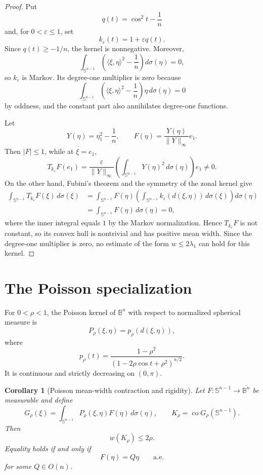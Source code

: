 \documentclass[11pt,reqno]{amsart}
\newtheorem{corollary}[theorem]{Corollary}
\theoremstyle{remark}
\begin{document}
\begin{proof}
Put
\[
 q(t)=\cos^2t-\frac1n
\]
and, for $0<\varepsilon\le1$, set
\[
 k_\varepsilon(t)=1+\varepsilon q(t).
\]
Since $q(t)\ge-1/n$, the kernel is nonnegative.  Moreover,
\[
 \int_{\mathbb S^{n-1}}
 \left(
 \langle\xi,\eta\rangle^2-\frac1n
 \right)d\sigma(\eta)=0,
\]
so $k_\varepsilon$ is Markov.  Its degree-one multiplier is zero because
\[
 \int_{\mathbb S^{n-1}}
 \left(
 \langle\xi,\eta\rangle^2-\frac1n
 \right)\eta\,d\sigma(\eta)=0
\]
by oddness, and the constant part also annihilates degree-one functions.

Let
\[
 Y(\eta)=\eta_1^2-\frac1n,
 \qquad
 F(\eta)=\frac{Y(\eta)}{\|Y\|_\infty}e_1.
\]
Then $|F|\le1$, while at $\xi=e_1$,
\[
 T_{k_\varepsilon}F(e_1)
 =
 \frac{\varepsilon}{\|Y\|_\infty}
 \left(
 \int_{\mathbb S^{n-1}}Y(\eta)^2\,d\sigma(\eta)
 \right)e_1
 \ne0.
\]
On the other hand, Fubini's theorem and the symmetry of the zonal kernel
give
\begin{align*}
 \int_{\mathbb S^{n-1}}T_{k_\varepsilon}F(\xi)\,d\sigma(\xi)
 &=
 \int_{\mathbb S^{n-1}}F(\eta)
 \left(
   \int_{\mathbb S^{n-1}}
   k_\varepsilon(d(\xi,\eta))\,d\sigma(\xi)
 \right)d\sigma(\eta)\\
 &=\int_{\mathbb S^{n-1}}F(\eta)\,d\sigma(\eta)=0,
\end{align*}
where the inner integral equals $1$ by the Markov normalization.
Hence $T_{k_\varepsilon}F$ is not constant, so its convex hull is
nontrivial and has positive mean width.  Since the degree-one multiplier
is zero, no estimate of the form
$w\le2\lambda_1$ can hold for this kernel.
\end{proof}

\section{The Poisson specialization}

For $0<\rho<1$, the Poisson kernel of $\mathbb B^n$ with respect to
normalized spherical measure is
\[
 P_\rho(\xi,\eta)
 =
 p_\rho(d(\xi,\eta)),
\]
where
\begin{equation}\label{eq:prho}
 p_\rho(t)
 =
 \frac{1-\rho^2}
 {(1-2\rho\cos t+\rho^2)^{n/2}}.
\end{equation}
It is continuous and strictly decreasing on $(0,\pi)$.

\begin{corollary}[Poisson mean-width contraction and rigidity]
\label{cor:PoissonWidth}
Let
$F:\mathbb S^{n-1}\to\overline{\mathbb B^n}$ be measurable and define
\[
 G_\rho(\xi)
 =
 \int_{\mathbb S^{n-1}}
 P_\rho(\xi,\eta)F(\eta)\,d\sigma(\eta),
 \qquad
 K_\rho=\operatorname{co}G_\rho(\mathbb S^{n-1}).
\]
Then
\[
w(K_\rho)\le2\rho.
\]
Equality holds if and only if
\[
 F(\eta)=Q\eta
 \qquad\text{a.e.}
\]
for some $Q\in O(n)$.
\end{corollary}
\end{document}
